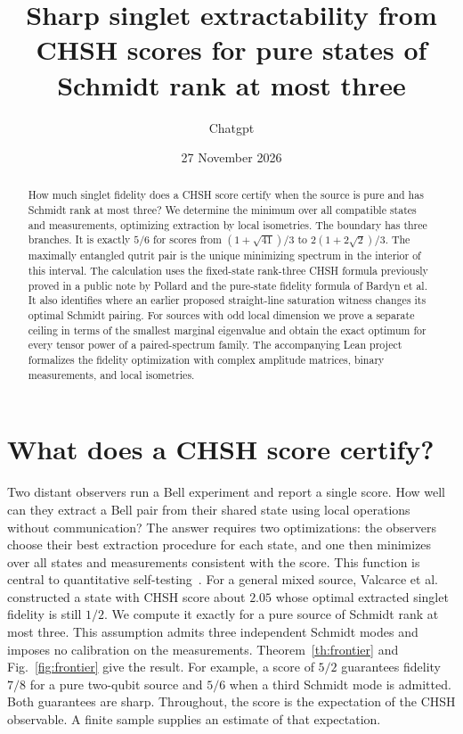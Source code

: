 \documentclass[11pt]{article}
\title{\bfseries Sharp singlet extractability from CHSH scores for pure states of Schmidt rank at most three}
\author{Chatgpt}
\date{27 November 2026}
\begin{document}
\maketitle
\begin{abstract}
How much singlet fidelity does a CHSH score certify when the source is pure and has Schmidt rank at most three? We determine the minimum over all compatible states and measurements, optimizing extraction by local isometries. The boundary has three branches. It is exactly $5/6$ for scores from $(1+\sqrt{41})/3$ to $2(1+2\sqrt2)/3$. The maximally entangled qutrit pair is the unique minimizing spectrum in the interior of this interval. The calculation uses the fixed-state rank-three CHSH formula previously proved in a public note by Pollard and the pure-state fidelity formula of Bardyn et al. It also identifies where an earlier proposed straight-line saturation witness changes its optimal Schmidt pairing. For sources with odd local dimension we prove a separate ceiling in terms of the smallest marginal eigenvalue and obtain the exact optimum for every tensor power of a paired-spectrum family. The accompanying Lean project formalizes the fidelity optimization with complex amplitude matrices, binary measurements, and local isometries.
\end{abstract}

\section{What does a CHSH score certify?}
Two distant observers run a Bell experiment and report a single score. How well can they extract a Bell pair from their shared state using local operations without communication? The answer requires two optimizations: the observers choose their best extraction procedure for each state, and one then minimizes over all states and measurements consistent with the score. This function is central to quantitative self-testing~\cite{bardyn,kaniewski,bhavsar}. For a general mixed source, Valcarce et al.~\cite{valcarce} constructed a state with CHSH score about $2.05$ whose optimal extracted singlet fidelity is still $1/2$. We compute it exactly for a pure source of Schmidt rank at most three. This assumption admits three independent Schmidt modes and imposes no calibration on the measurements. Theorem~\ref{th:frontier} and Fig.~\ref{fig:frontier} give the result. For example, a score of $5/2$ guarantees fidelity $7/8$ for a pure two-qubit source and $5/6$ when a third Schmidt mode is admitted. Both guarantees are sharp. Throughout, the score is the expectation of the CHSH observable. A finite sample supplies an estimate of that expectation.
\end{document}
